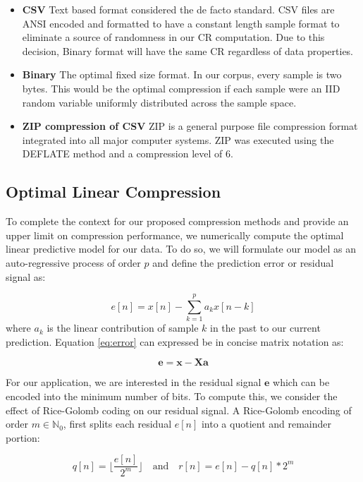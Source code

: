 \documentclass[journal]{IEEEtran}
\begin{document}
\begin{itemize}
  \item \textbf{CSV} Text based format considered the de facto standard. CSV files are ANSI encoded and formatted to have a constant length sample format to eliminate a source of randomness in our CR computation. Due to this decision, Binary format will have the same CR regardless of data properties. 
  \item \textbf{Binary} The optimal fixed size format. In our corpus, every sample is two bytes. This would be the optimal compression if each sample were an IID random variable uniformly distributed across the sample space.
  \item \textbf{ZIP compression of CSV} ZIP is a general purpose file compression format integrated into all major computer systems. ZIP was executed using the DEFLATE method \cite{Deutsch1996} and a compression level of 6.
\end{itemize}

\subsection{Optimal Linear Compression}

To complete the context for our proposed compression methods and provide an upper limit on compression performance, we numerically compute the optimal linear predictive model for our data. To do so, we will formulate our model as an auto-regressive process of order $p$ and define the prediction error or residual signal as:

\begin{equation}
e[n] = x[n] - \sum_{k=1}^{p}a_{k}x[n-k]
\label{eq:error}
\end{equation}
where $a_k$ is the linear contribution of sample $k$ in the past to our current prediction. Equation \eqref{eq:error} can expressed be in concise matrix notation as: 

$$\mathbf{e} = \mathbf{x} - \mathbf{Xa}$$

For our application, we are interested in the residual signal $\mathbf{e}$ which can be encoded into the minimum number of bits. To compute this, we consider the effect of Rice-Golomb coding on our residual signal. A Rice-Golomb encoding of order $m \in \mathbb{N}_0$, first splits each residual $e[n]$ into a quotient and remainder portion:

$$ q[n] = \lfloor \frac{e[n]}{2^m} \rfloor\quad \textrm{and} \quad r[n] = e[n] - q[n] * 2^m  $$
\end{document}
